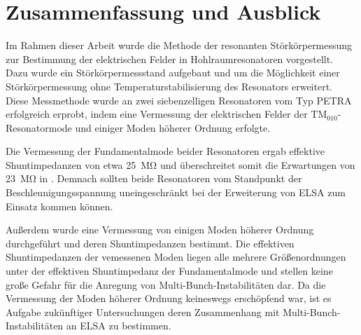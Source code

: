\chapter{Zusammenfassung und Ausblick}
\label{sec:fazit}
Im Rahmen dieser Arbeit wurde die Methode der resonanten Störkörpermessung zur Bestimmung der elektrischen Felder in Hohlraumresonatoren vorgestellt.
Dazu wurde ein Störkörpermessstand aufgebaut und um die Möglichkeit einer Störkörpermessung ohne Temperaturstabilisierung des Resonators erweitert.
Diese Messmethode wurde an zwei siebenzelligen Resonatoren vom Typ PETRA erfolgreich erprobt, indem eine Vermessung der elektrischen Felder der $\mathrm{TM}_{010}$-Resonatormode und einiger Moden höherer Ordnung erfolgte.

Die Vermessung der Fundamentalmode beider Resonatoren ergab effektive Shuntimpedanzen von etwa \SI{25}{\mega\ohm} und überschreitet somit die Erwartungen von \SI{23}{\mega\ohm} in \cite{schedler}.
Demnach sollten beide Resonatoren vom Standpunkt der Beschleunigungsspannung uneingeschränkt bei der Erweiterung von ELSA zum Einsatz kommen können.

Außerdem wurde eine Vermessung von einigen Moden höherer Ordnung durchgeführt und deren Shuntimpedanzen bestimmt.
Die effektiven Shuntimpedanzen der vemessenen Moden liegen alle mehrere Größenordnungen unter der effektiven Shuntimpedanz der Fundamentalmode und stellen keine große Gefahr für die Anregung von Multi-Bunch-Instabilitäten dar.
Da die Vermessung der Moden höherer Ordnung keineswegs erschöpfend war, ist es Aufgabe zukünftiger Untersuchungen deren Zusammenhang mit Multi-Bunch-Instabilitäten an ELSA zu bestimmen.
